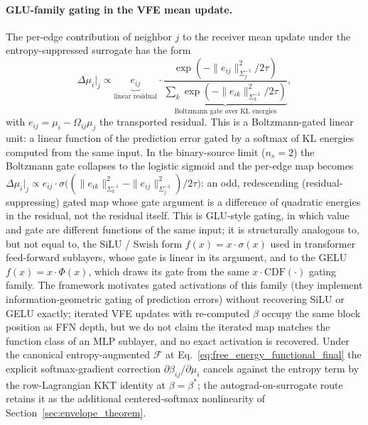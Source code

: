 \paragraph{GLU-family gating in the VFE mean update.}
The per-edge contribution of neighbor $j$ to the receiver mean update under the entropy-suppressed surrogate has the form
\begin{equation}
\Delta\mu_i\big|_j \propto \underbrace{e_{ij}}_{\text{linear residual}} \cdot \underbrace{\frac{\exp(-\|e_{ij}\|^2_{\Sigma_j^{-1}} / 2\tau)}{\sum_k \exp(-\|e_{ik}\|^2_{\Sigma_k^{-1}}/2\tau)}}_{\text{Boltzmann gate over KL energies}},
\label{eq:vfe_glu}
\end{equation}
with $e_{ij} = \mu_i - \Omega_{ij}\mu_j$ the transported residual. This is a Boltzmann-gated linear unit: a linear function of the prediction error gated by a softmax of KL energies computed from the same input. In the binary-source limit ($n_s = 2$) the Boltzmann gate collapses to the logistic sigmoid and the per-edge map becomes $\Delta\mu_i\big|_j \propto e_{ij}\cdot\sigma\big((\|e_{ik}\|^2_{\Sigma_k^{-1}} - \|e_{ij}\|^2_{\Sigma_j^{-1}})/2\tau\big)$: an odd, redescending (residual-suppressing) gated map whose gate argument is a difference of quadratic energies in the residual, not the residual itself. This is GLU-style gating, in which value and gate are different functions of the same input; it is structurally analogous to, but not equal to, the SiLU / Swish form $f(x) = x\cdot\sigma(x)$ used in transformer feed-forward sublayers, whose gate is linear in its argument, and to the GELU $f(x) = x\cdot\Phi(x)$, which draws its gate from the same $x\cdot\mathrm{CDF}(\cdot)$ gating family. The framework motivates gated activations of this family (they implement information-geometric gating of prediction errors) without recovering SiLU or GELU exactly; iterated VFE updates with re-computed $\beta$ occupy the same block position as FFN depth, but we do not claim the iterated map matches the function class of an MLP sublayer, and no exact activation is recovered. Under the canonical entropy-augmented $\mathcal{F}$ at Eq.~\eqref{eq:free_energy_functional_final} the explicit softmax-gradient correction $\partial\beta_{ij}/\partial\mu_i$ cancels against the entropy term by the row-Lagrangian KKT identity at $\beta = \beta^*$; the autograd-on-surrogate route retains it as the additional centered-softmax nonlinearity of Section~\ref{sec:envelope_theorem}.

